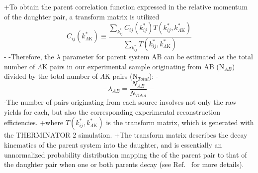 \begin{table}[htbp]
\begin{table}[htbp]
 
\sout{\color{red}{In order to obtain the parent correlation function expressed in the relative momentum of the daughter pair, one must use a transform matrix.}}
\sout{\color{red}{The transform matrix describes the decay kinematics of the parent system into the daughter, and maps the \kstar of the parent pair onto that of the daughter.}}
\sout{\color{red}{Using this matrix, the transformed residual correlation function can be obtained:}}
+To obtain the parent correlation function expressed in the relative momentum of the daughter pair, a transform matrix is utilized
 \begin{equation}
   C_{ij}(k^{*}_{\Lambda\mathrm{K}}) \equiv \frac{\sum\limits_{k^{*}_{ij}} C_{ij}\left(k^{*}_{ij}\right) T\left(k^{*}_{ij},k^{*}_{\Lambda\mathrm{K}}\right)}{\sum\limits_{k^{*}_{ij}} T\left(k^{*}_{ij},k^{*}_{\Lambda\mathrm{K}}\right)}
 \label{eqn:ResidualsTransform}
 \end{equation}
\sout{}
\sout{}
\sout{\color{red}{The transform matrix is essentially an unnormalized probability distribution mapping the \kstar of the parent pair to that of the daughter pair when one or both parents decay.}}
- 
\sout{\color{red}{As previously stated, the $\lambda$ parameters dictate the strength of the parent contribution to the daughter pair.  }}
-Therefore, the $\lambda$ parameter for parent system AB can be estimated as the total number of $\Lambda$K pairs in our experimental sample originating from AB (N$_{AB}$) divided by the total number of $\Lambda$K pairs (N$_{Total}$):
-\begin{equation}
-\lambda_{AB} = \frac{N_{AB}}{N_{Total}}
-\end{equation}
-The number of \LamK pairs originating from each source involves not only the raw yields for each, but also the corresponding experimental reconstruction efficiencies.
+where $T(k^{*}_{ij},k^{*}_{\Lambda\mathrm{K}})$ is the transform matrix, which is generated with the THERMINATOR 2 \cite{Chojnacki:2011hb} simulation. 
+The transform matrix describes the decay kinematics of the parent system into the daughter, and is essentially an unnormalized probability distribution mapping the \kstar of the parent pair to that of the daughter pair when one or both parents decay (see Ref.\ \cite{Kisiel:2014mma} for more details).

\end{table}
\end{table}
